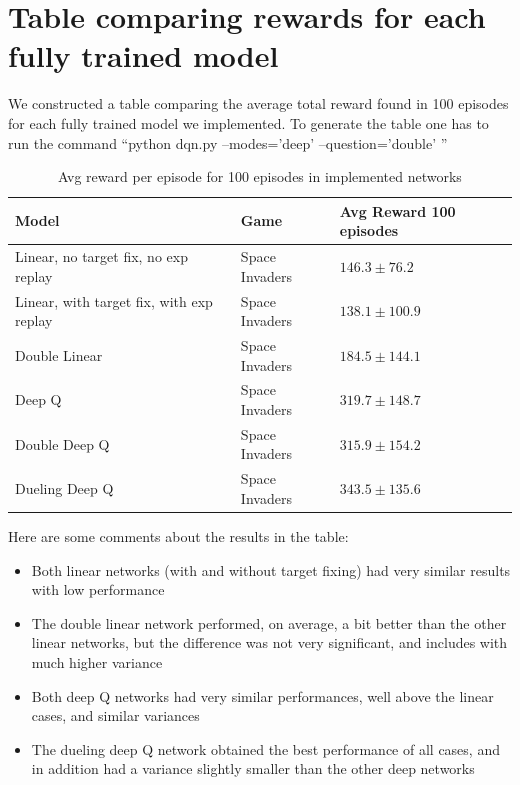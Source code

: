 \documentclass{article}
\begin{document}
\section{Table comparing rewards for each fully trained model} %
\label{sec:table_comparing_rewards_for_each_fully_trained_model}
We constructed a table comparing the average total reward found in 100 episodes for each fully trained model we implemented. To generate the table one has to run the command ``python dqn.py --modes='deep' --question='double' ''

\begin{table}[h]
  \caption{Avg reward per episode for 100 episodes in implemented networks}
  \label{sample-table}
  \centering
  \begin{tabular}{lll}
    \toprule

    Model     & Game     & Avg Reward 100 episodes \\
    \midrule
    Linear, no target fix, no exp replay & Space Invaders  & $146.3\pm76.2$     \\
    Linear, with target fix, with exp replay & Space Invaders  & $138.1\pm100.9$     \\
    Double Linear & Space Invaders  & $184.5\pm144.1$     \\
    Deep Q & Space Invaders  & $319.7\pm148.7$     \\
    Double Deep Q & Space Invaders  & $315.9\pm154.2$     \\
    Dueling Deep Q & Space Invaders  & $343.5\pm135.6$     \\
    \bottomrule
  \end{tabular}
\end{table}

Here are some comments about the results in the table:
\begin{itemize}
  \item Both linear networks (with and without target fixing) had very similar results with low performance
  \item The double linear network performed, on average, a bit better than the other linear networks, but the difference was not very significant, and includes with much higher variance
  \item Both deep Q networks had very similar performances, well above the linear cases, and similar variances
  \item The dueling deep Q network obtained the best performance of all cases, and in addition had a variance slightly smaller than the other deep networks 
\end{itemize}
\end{document}
